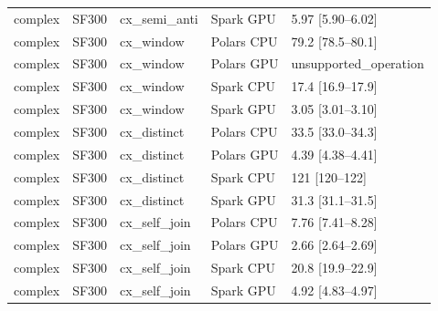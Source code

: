 \begin{longtable}{lllll}
complex & SF300 & cx\_semi\_anti & Spark GPU & 5.97 [5.90--6.02] \\
complex & SF300 & cx\_window & Polars CPU & 79.2 [78.5--80.1] \\
complex & SF300 & cx\_window & Polars GPU & unsupported\_operation \\
complex & SF300 & cx\_window & Spark CPU & 17.4 [16.9--17.9] \\
complex & SF300 & cx\_window & Spark GPU & 3.05 [3.01--3.10] \\
complex & SF300 & cx\_distinct & Polars CPU & 33.5 [33.0--34.3] \\
complex & SF300 & cx\_distinct & Polars GPU & 4.39 [4.38--4.41] \\
complex & SF300 & cx\_distinct & Spark CPU & 121 [120--122] \\
complex & SF300 & cx\_distinct & Spark GPU & 31.3 [31.1--31.5] \\
complex & SF300 & cx\_self\_join & Polars CPU & 7.76 [7.41--8.28] \\
complex & SF300 & cx\_self\_join & Polars GPU & 2.66 [2.64--2.69] \\
complex & SF300 & cx\_self\_join & Spark CPU & 20.8 [19.9--22.9] \\
complex & SF300 & cx\_self\_join & Spark GPU & 4.92 [4.83--4.97] \\
\end{longtable}
